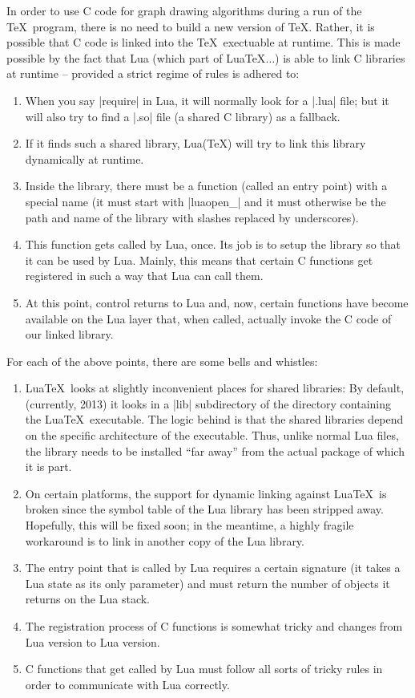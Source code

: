 In order to use C code for graph drawing algorithms during a run of
the \TeX\ program, there is no need to build a new version of
\TeX. Rather, it is possible that C code is linked into the \TeX\
exectuable at runtime. This is made possible by the fact that Lua
(which part of Lua\TeX$\dots$) is able to link C libraries at runtime --
provided a strict regime of rules is adhered to:

\begin{enumerate}
\item When you say |require| in Lua, it will normally look for a
  |.lua| file; but it will also try to find a |.so| file (a shared C
  library) as a fallback.
\item If it finds such a shared library, Lua(\TeX) will try to link
  this library dynamically at runtime.
\item Inside the library, there must be a function (called an entry
  point) with a special name (it must start with |luaopen_| and it
  must otherwise be the path and name of the library with slashes replaced by
  underscores).
\item This function gets called by Lua, once. Its job is to setup the
  library so that it can be used by Lua. Mainly, this means that
  certain C functions get registered in such a way that Lua can call
  them.
\item At this point, control returns to Lua and, now, certain
  functions have become available on the Lua layer that, when called,
  actually invoke the C code of our linked library.
\end{enumerate}

For each of the above points, there are some bells and whistles:

\begin{enumerate}
\item Lua\TeX\ looks at slightly inconvenient places for shared
  libraries: By default, (currently, 2013) it looks in a |lib|
  subdirectory of the directory containing the Lua\TeX\
  executable. The logic behind is that the shared libraries depend on
  the specific architecture of the executable. Thus, unlike normal Lua
  files, the library needs to be installed ``far away'' from the actual
  package of which it is part.
\item On certain platforms, the support for dynamic linking against
  Lua\TeX\ is broken since the symbol table of the Lua library has been
  stripped away. Hopefully, this will be fixed soon; in the meantime, a
  highly fragile workaround is to link in another copy of the Lua
  library.
\item The entry point that is called by Lua requires a certain
  signature (it takes a Lua state as its only parameter) and must
  return the number of objects it returns on the Lua stack.
\item The registration process of C functions is somewhat tricky and
  changes from Lua version to Lua version.
\item C functions that get called by Lua must follow all sorts of
  tricky rules in order to communicate with Lua correctly.
\end{enumerate}

